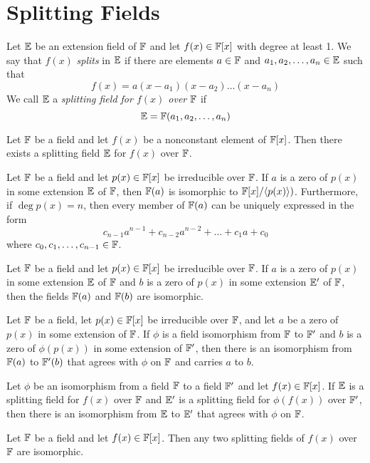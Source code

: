 \section{Splitting Fields}

\begin{definition}
	Let $\mathbb{E}$ be an extension field of $\mathbb{F}$ and let $f(x) \in \mathbb{F}[x]$ with degree at least 1. We say that $f(x)$ \textit{splits} in $\mathbb{E}$ if there are elements $a \in \mathbb{F}$ and $a_1,a_2,\dots,a_n \in \mathbb{E}$ such that
	\[ f(x) = a(x-a_1)(x-a_2)\dots(x-a_n) \]
	We call $\mathbb{E}$ a \textit{splitting field for $f(x)$ over $\mathbb{F}$} if
	\[ \mathbb{E} = \mathbb{F}(a_1,a_2,\dots,a_n) \]
\end{definition}

\begin{theorem}
	Let $\mathbb{F}$ be a field and let $f(x)$ be a nonconstant element of $\mathbb{F}[x]$. Then there exists a splitting field $\mathbb{E}$ for $f(x)$ over $\mathbb{F}$.
\end{theorem}

\begin{theorem}
	Let $\mathbb{F}$ be a field and let $p(x) \in \mathbb{F}[x]$ be irreducible over $\mathbb{F}$. If $a$ is a zero of $p(x)$ in some extension $\mathbb{E}$ of $\mathbb{F}$, then $\mathbb{F}(a)$ is isomorphic to $\mathbb{F}[x]/\langle p(x) \rangle)$. Furthermore, if $\deg p(x) = n$, then every member of $\mathbb{F}(a)$ can be uniquely expressed in the form
	\[ c_{n-1}a^{n-1}+c_{n-2}a^{n-2}+\dots+c_1a+c_0 \]
	where $c_0,c_1,\dots,c_{n-1} \in \mathbb{F}$.
\end{theorem}

\begin{corollary}
	Let $\mathbb{F}$ be a field and let $p(x) \in \mathbb{F}[x]$ be irreducible over $\mathbb{F}$. If $a$ is a zero of $p(x)$ in some extension $\mathbb{E}$ of $\mathbb{F}$ and $b$ is a zero of $p(x)$ in some extension $\mathbb{E}'$ of $\mathbb{F}$, then the fields $\mathbb{F}(a)$ and $\mathbb{F}(b)$ are isomorphic.
\end{corollary}

\begin{lemma}
	Let $\mathbb{F}$ be a field, let $p(x) \in \mathbb{F}[x]$ be irreducible over $\mathbb{F}$, and let $a$ be a zero of $p(x)$ in some extension of $\mathbb{F}$. If $\phi$ is a field isomorphism from $\mathbb{F}$ to $\mathbb{F}'$ and $b$ is a zero of $\phi(p(x))$ in some extension of $\mathbb{F}'$, then there is an isomorphism from $\mathbb{F}(a)$ to $\mathbb{F}'(b)$ that agrees with $\phi$ on $\mathbb{F}$ and carries $a$ to $b$.
\end{lemma}

\begin{theorem}
	Let $\phi$ be an isomorphism from a field $\mathbb{F}$ to a field $\mathbb{F}'$ and let $f(x) \in \mathbb{F}[x]$. If $\mathbb{E}$ is a splitting field for $f(x)$ over $\mathbb{F}$ and $\mathbb{E}'$ is a splitting field for $\phi(f(x))$ over $\mathbb{F}'$, then there is an isomorphism from $\mathbb{E}$ to $\mathbb{E}'$ that agrees with $\phi$ on $\mathbb{F}$.
\end{theorem}

\begin{corollary}
	Let $\mathbb{F}$ be a field and let $f(x) \in \mathbb{F}[x]$. Then any two splitting fields of $f(x)$ over $\mathbb{F}$ are isomorphic.
\end{corollary}
